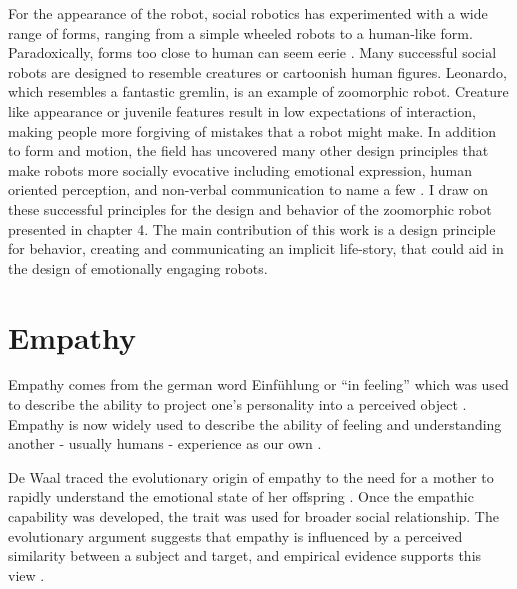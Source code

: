 

For the appearance of the robot, social robotics has experimented with a wide range of forms, ranging from a simple wheeled robots to a human-like form. Paradoxically, forms too close to human can seem eerie \cite{mori_uncanny_valley}. Many successful social robots are designed to resemble creatures or cartoonish human figures. Leonardo, which resembles a fantastic gremlin, is an example of zoomorphic robot. Creature like appearance or juvenile features result in low expectations of interaction, making people more forgiving of mistakes that a robot might make. In addition to form and motion, the field has uncovered many other design principles that make robots more socially evocative including emotional expression, human oriented perception, and non-verbal communication to name a few \cite{fong_survey_socially_interactive_bots}. I draw on these successful principles for the design and behavior of the zoomorphic robot presented in chapter 4. The main contribution of this work is a design principle for behavior, creating and communicating an implicit life-story, that could aid in the design of emotionally engaging robots. 





\section{Empathy}
\label{sec_background_empathy}
Empathy comes from the german word Einf\"{u}hlung or ``in feeling'' which was used to describe the ability to project one's personality into a perceived object \cite{empathy_etymology}. Empathy is now widely used to describe the ability of feeling and understanding another - usually humans - experience as our own \cite{decety_human_empathy}.

De Waal traced the evolutionary origin of empathy to the need for a mother to rapidly understand the emotional state of her offspring \cite{de_waal_altruism_empathy}. Once the empathic capability was developed, the trait was used for broader social relationship. The evolutionary argument suggests that empathy is influenced by a perceived similarity between a subject and target, and empirical evidence supports this view \cite{krebs_empathy_altruism}.

